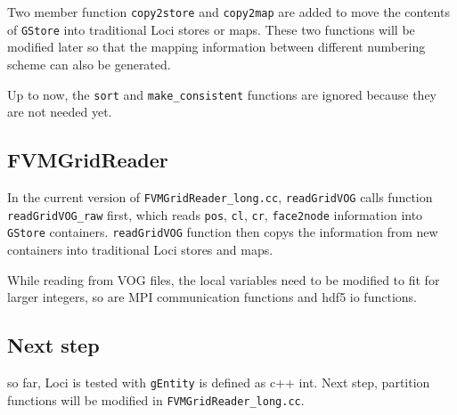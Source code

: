\documentclass{article}
\begin{document}
Two member function \texttt{copy2store} and \texttt{copy2map} are added to move the
contents of \texttt{GStore} into traditional Loci stores or maps. These two
functions will be modified later so that the mapping information
between different numbering scheme can also be generated. 

Up to now, the \texttt{sort} and \texttt{make\_consistent} functions are ignored because
they are not needed yet.  

 
\subsection{FVMGridReader}  
  In the current version of \texttt{FVMGridReader\_long.cc}, \texttt{readGridVOG} calls function \texttt{readGridVOG\_raw}
  first,  which reads \texttt{pos}, \texttt{cl}, \texttt{cr}, \texttt{face2node} information into \texttt{GStore}
  containers. \texttt{readGridVOG} function then  copys the information from new
  containers into traditional Loci stores and maps.

  While reading from VOG files, the local variables need to be modified
  to fit for larger integers, so are MPI communication functions and hdf5 io
  functions. 
   
\subsection{Next step}        
 so far, Loci is tested with \texttt{gEntity} is defined as c++ int. Next step,
 partition functions will be modified in \texttt{FVMGridReader\_long.cc}.
\end{document}
